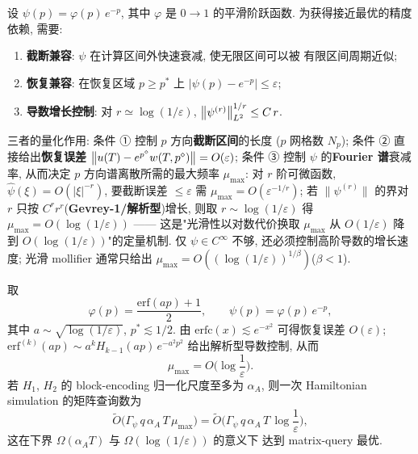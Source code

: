\documentclass[utf8]{article} %
\numberwithin{equation}{section}   %
\newtheorem{Note}{\hskip 2em {\color{red} 注}}[subsection]
\begin{document}
\begin{Note}
    设 $\psi(p) = \varphi(p)\,e^{-p}$, 其中 $\varphi$ 是 $0 \to 1$ 的平滑阶跃函数.
    为获得接近最优的精度依赖, 需要:
    \begin{enumerate}
        \item \textbf{截断兼容}: $\psi$ 在计算区间外快速衰减, 使无限区间可以被
        有限区间周期近似;
        \item \textbf{恢复兼容}: 在恢复区域 $p \ge p^*$ 上
        $|\psi(p) - e^{-p}| \le \varepsilon$;
        \item \textbf{导数增长控制}: 对 $r \simeq \log(1/\varepsilon)$,
        $\norm{\psi^{(r)}}_{L^2}^{1/r} \le C\, r$.
    \end{enumerate}
    三者的量化作用: 条件 ① 控制 $p$ 方向\textbf{截断区间}的长度
    ($p$ 网格数 $N_p$); 条件 ② 直接给出\textbf{恢复误差}
    $\norm{u(T) - e^{p^\diamond}w(T,p^\diamond)} = O(\varepsilon)$;
    条件 ③ 控制 $\psi$ 的\textbf{Fourier 谱}衰减率, 从而决定 $p$ 方向谱离散所需的最大频率
    $\mu_{\max}$: 对 $r$ 阶可微函数, $\hat\psi(\xi) = O(|\xi|^{-r})$,
    要截断误差 $\le\varepsilon$ 需 $\mu_{\max} = O(\varepsilon^{-1/r})$;
    若 $\|\psi^{(r)}\|$ 的界对 $r$ 只按 $C^r r^r$(\textbf{Gevrey-1/解析型})增长,
    则取 $r \sim \log(1/\varepsilon)$ 得 $\mu_{\max} = O(\log(1/\varepsilon))$ ——
    这是"光滑性以对数代价换取 $\mu_{\max}$ 从 $O(1/\varepsilon)$ 降到
    $O(\log(1/\varepsilon))$"的定量机制.
    仅 $\psi \in C^\infty$ 不够, 还必须控制高阶导数的增长速度;
    光滑 mollifier 通常只给出
    $\mu_{\max} = O((\log(1/\varepsilon))^{1/\beta})$($\beta < 1$).
\end{Note}

\begin{Note}
    取
    \begin{equation}
        \varphi(p) = \frac{\mathrm{erf}(a p) + 1}{2}, \qquad
        \psi(p) = \varphi(p)\,e^{-p},
    \end{equation}
    其中 $a \sim \sqrt{\log(1/\varepsilon)}$, $p^* \lesssim 1/2$.
    由 $\mathrm{erfc}(x) \lesssim e^{-x^2}$ 可得恢复误差 $O(\varepsilon)$;
    $\mathrm{erf}^{(k)}(ap) \sim a^k H_{k-1}(ap)\,e^{-a^2p^2}$
    给出解析型导数控制, 从而
    \begin{equation}
        \mu_{\max} = O\!\Big(\log\frac{1}{\varepsilon}\Big).
    \end{equation}
    若 $H_1$, $H_2$ 的 block-encoding 归一化尺度至多为 $\alpha_A$, 则一次
    Hamiltonian simulation 的矩阵查询数为
    \begin{equation}
        \widetilde O\!\Big(\Gamma_\psi\, q\, \alpha_A\, T\, \mu_{\max}\Big)
        = \widetilde O\!\Big(\Gamma_\psi\, q\, \alpha_A\, T\,
        \log\frac{1}{\varepsilon}\Big),
    \end{equation}
    这在下界 $\Omega(\alpha_A T)$ 与 $\Omega(\log(1/\varepsilon))$ 的意义下
    达到 matrix-query 最优.
\end{Note}
\end{document}
